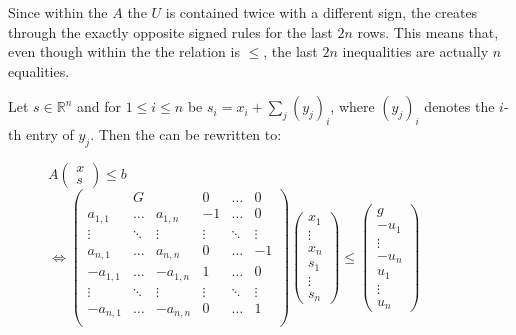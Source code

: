 Since within the \iterationmatrix $A$ the \updatematrix $U$ is contained twice with a different sign, the \iterationmatrix creates through the \pointc exactly opposite signed rules for the last $2n$ rows.
This means that, even though within the \pointc the relation is $\le$, the last $2n$ inequalities are actually $n$ equalities.\newline

Let $s\in \mathbb{R}^n$ and for $1 \le i \le n$ be $s_i=x_i+\sum_{j} (y_j)_i$, where $(y_j)_i$ denotes the $i$-th entry of $y_j$.
Then the \pointc can be rewritten to: 
\begin{figure}[H]
	\centering
	
	$A\begin{pmatrix} x \\ s \end{pmatrix} \le b$ \newline
	\hspace*{-6em}
	$\Leftrightarrow \begin{pmatrix}
				 & G 		& 			& 0 	 & \dots  & 0 \\
		a_{1,1}  & \dots 	& a_{1,n}	& -1 	 & \dots  & 0 \\
		\vdots   & \ddots 	& \vdots	& \vdots & \ddots & \vdots \\
		a_{n,1}  & \dots 	& a_{n,n}	& 0 	 & \dots  & -1 \\
		-a_{1,1} & \dots 	& -a_{1,n}	& 1 	 & \dots  & 0 \\
		\vdots   & \ddots 	& \vdots	& \vdots & \ddots & \vdots \\
		-a_{n,1} & \dots 	& -a_{n,n}	& 0 	 & \dots  & 1 \\
	\end{pmatrix} \begin{pmatrix} x_1 \\ \vdots \\ x_n \\ s_1 \\ \vdots \\ s_n\end{pmatrix} \le \begin{pmatrix} g \\ -u_1 \\ \vdots\\ -u_n \\ u_1 \\ \vdots \\ u_n \end{pmatrix}$\\ %
\end{figure}
